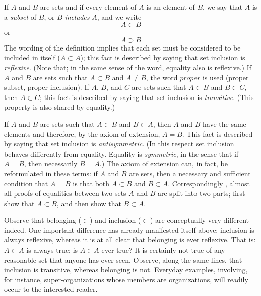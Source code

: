 If $A$ and $B$ are sets and if every element of $A$ is an element of $B$, we say that $A$ is a \textit{subset} of $B$, or $B$ \textit{includes} $A$, and we write 
\begin{equation*}
A \subset B
\end{equation*}
or
\begin{equation*}
A \supset B
\end{equation*}
The wording of the definition implies that each set must be considered to be included in itself ($A \subset A$); this fact is described by saying that set inclusion is \textit{reflexive}. (Note that; in the same sense of the word, equality also is reflexive.) If $A$ and $B$ are sets such that $A \subset B$ and $A \neq B$, the word $proper$ is used (proper subset, proper inclusion). If $A$, $B$, and $C$ are sets such that $A \subset B$ and $B \subset C$, then $A \subset C$; this fact is described by saying that set inclusion is \textit{transitive}. (This property is also shared by equality.)

If $A$ and $B$ are sets such that $A \subset B$ and $B \subset A$, then $A$ and $B$ have the same elements and therefore, by the axiom of extension, $A = B$. This fact is described by saying that set inclusion is \textit{antisymmetric}. (In this respect set inclusion behaves differently from equality. Equality is \textit{symmetric}, in the sense that if $A = B$, then necessarily $B = A$.) The axiom of extension can, in fact, be reformulated in these terms: if $A$ and $B$ are sets, then a necessary and sufficient condition that $A = B$ is that both $A \subset B$ and $B \subset A$. Correspondingly , almost all proofs of equalities between two sets $A$ and $B$ are split into two parts; first show that $A \subset B$, and then show that $B \subset A$. 

Observe that belonging ($ \in $) and inclusion ($ \subset$) are conceptually very different indeed. One important difference has already manifested itself above: inclusion is always reflexive, whereas it is at all clear that belonging is ever reflexive. That is: $A \subset A$ is always true; is $A \in A $ ever true? It is certainly not true of any reasonable set that anyone has ever seen. Observe, along the same lines, that inclusion is transitive, whereas belonging is not. Everyday examples, involving, for instance, super-organizations whose members are organizations, will readily occur to the interested reader.